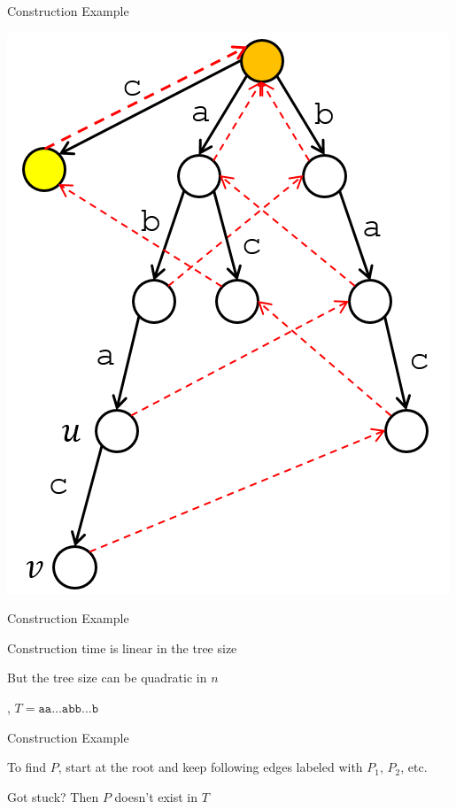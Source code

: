 \documentclass[13pt,onlymath]{beamer}
\begin{document}
\begin{frame}{Construction Example}
\begin{center}
\includegraphics[height=0.5\textheight]{figures/trie6}
\end{center}
\end{frame}

\begin{frame}{Construction Example}
\BIT
\item Construction time is linear in the tree size
\item But the tree size can be quadratic in $n$
\BIT
\item \eg, $T = \mathtt{aa}\ldots\mathtt{abb}\ldots\mathtt{b}$
\EIT\EIT
\end{frame}

\begin{frame}{Construction Example}
\BIT
\item To find $P$, start at the root and keep following edges labeled with $P_1$, $P_2$, etc.
\vfill
\item Got stuck? Then $P$ doesn't exist in $T$
\EIT
\end{frame}
\end{document}

